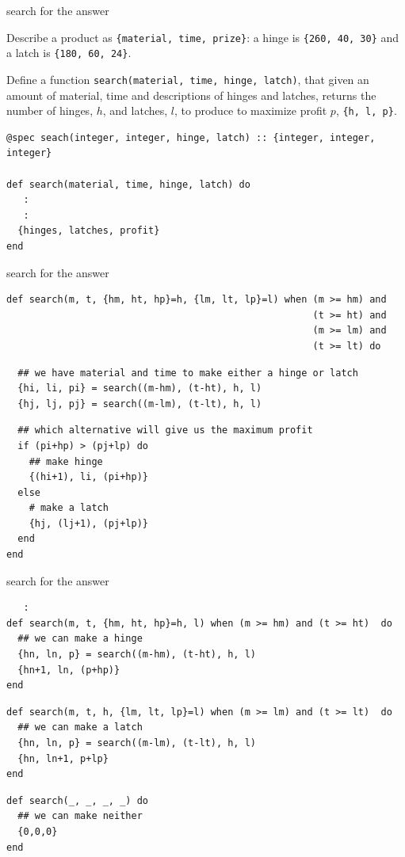 \begin{frame}[fragile]{search for the answer}

Describe a product as {\tt \{material, time, prize\}}: a hinge is {\tt \{260, 40, 30\}} and a latch is {\tt \{180, 60, 24\}}.

\pause\vspace{20pt}

Define a function {\tt search(material, time, hinge, latch)}, that
given an amount of material, time and descriptions of hinges and
latches, returns the number of hinges, $h$, and latches, $l$, to produce to
maximize profit $p$, {\tt \{h, l, p\}}.

\pause\vspace{20pt}

\begin{verbatim}
@spec seach(integer, integer, hinge, latch) :: {integer, integer, integer}

def search(material, time, hinge, latch) do
   :
   :
  {hinges, latches, profit}
end
\end{verbatim}
\end{frame}


\begin{frame}[fragile]{search for the answer}

\begin{verbatim}
def search(m, t, {hm, ht, hp}=h, {lm, lt, lp}=l) when (m >= hm) and
                                                      (t >= ht) and
                                                      (m >= lm) and
                                                      (t >= lt) do
\end{verbatim}\pause
\begin{verbatim}
  ## we have material and time to make either a hinge or latch
  {hi, li, pi} = search((m-hm), (t-ht), h, l)
  {hj, lj, pj} = search((m-lm), (t-lt), h, l)
\end{verbatim}\pause
\begin{verbatim}
  ## which alternative will give us the maximum profit
  if (pi+hp) > (pj+lp) do
    ## make hinge
    {(hi+1), li, (pi+hp)}
  else
    # make a latch
    {hj, (lj+1), (pj+lp)}
  end
end
\end{verbatim}
\end{frame}

\begin{frame}[fragile]{search for the answer}

\begin{verbatim}
   :
def search(m, t, {hm, ht, hp}=h, l) when (m >= hm) and (t >= ht)  do
  ## we can make a hinge
  {hn, ln, p} = search((m-hm), (t-ht), h, l)
  {hn+1, ln, (p+hp)}
end
\end{verbatim}\pause
\begin{verbatim}
def search(m, t, h, {lm, lt, lp}=l) when (m >= lm) and (t >= lt)  do
  ## we can make a latch
  {hn, ln, p} = search((m-lm), (t-lt), h, l)
  {hn, ln+1, p+lp}
end
\end{verbatim}\pause
\begin{verbatim}
def search(_, _, _, _) do
  ## we can make neither
  {0,0,0}
end
\end{verbatim}
\end{frame}


